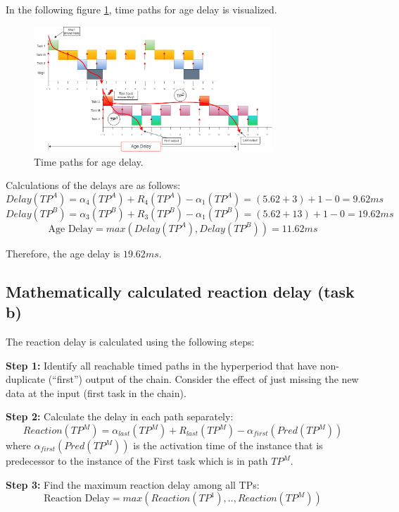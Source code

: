             In the following figure \ref{fig:agedelaypaths}, time paths for age delay is visualized.

            \begin{figure}[H]
                \centering
                \includegraphics[width=0.8\textwidth]{images/TimedPathAgeDelay.png}
                \caption{Time paths for age delay.}
                \label{fig:agedelaypaths}  
            \end{figure}

            Calculations of the delays are as follows:
            $$Delay(TP^A) = \alpha_4(TP^A) + R_4(TP^A) - \alpha_1(TP^A) = (5.62+3) + 1 - 0 = 9.62ms$$
            $$Delay(TP^B) = \alpha_3(TP^B) + R_3(TP^B) - \alpha_1(TP^B) = (5.62+13) + 1 - 0 = 19.62ms$$
            $$\text{Age Delay} = max(Delay(TP^A), Delay(TP^B)) = 11.62ms$$

            Therefore, the age delay is $19.62ms$.

        \subsection*{\textbf{Mathematically calculated reaction delay (task b)}}
            The reaction delay is calculated using the following steps:

            \textbf{Step 1:} Identify all reachable timed paths in the hyperperiod that have non-duplicate (“first”) output of the chain. Consider the effect of just missing the new data at the input (first task in the chain).

            \textbf{Step 2:} Calculate the delay in each path separately:
            $$Reaction(TP^M) = \alpha_{last}(TP^M) + R_{last}(TP^M) - \alpha_{first}(Pred(TP^M))$$
            where $\alpha_{first}(Pred(TP^M))$ is the activation time of the instance that is predecessor to the instance of the First task
            which is in path $TP^M$.

            \textbf{Step 3:} Find the maximum reaction delay among all TPs: 
            $$\text{Reaction Delay} = max(Reaction(TP^1),..,Reaction(TP^M))$$

